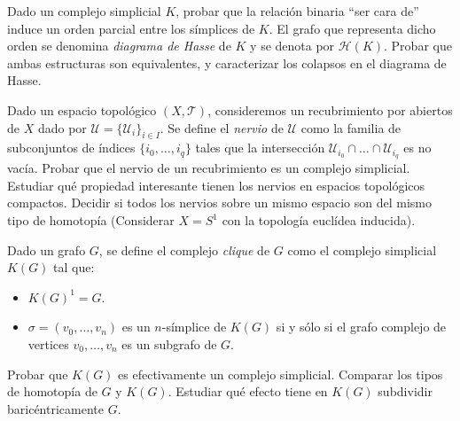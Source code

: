 \documentclass[twoside]{article}
\begin{document}
\newpage

\begin{ejercicio}{1.8}
Dado un complejo simplicial $K$, probar que la relación binaria ``ser cara de'' induce un orden parcial entre los símplices de $K$.
El grafo que representa dicho orden se denomina \emph{diagrama de Hasse} de $K$ y se denota por $\mathcal{H}(K)$.
Probar que ambas estructuras son equivalentes, y caracterizar los colapsos en el diagrama de Hasse.
\end{ejercicio}
\begin{solucion}
\end{solucion}

\newpage

\begin{ejercicio}{1.9}
Dado un  espacio topológico $(X,\mathcal{T})$, consideremos un recubrimiento por abiertos de $X$ dado por $\mathcal{U} = \{\mathcal{U}_i\}_{i \in I}$.
Se define el \emph{nervio} de $\mathcal{U}$ como la familia de subconjuntos de índices $\{i_0,\dots,i_q\}$ tales que la intersección $\mathcal{U}_{i_0} \cap \dots \cap \mathcal{U}_{i_q}$ es no vacía.
Probar que el nervio de un recubrimiento es un complejo simplicial.
Estudiar qué propiedad interesante tienen los nervios en espacios topológicos compactos.
Decidir si todos los nervios sobre un mismo espacio son del mismo tipo de homotopía
(Considerar $X = S^1$ con la topología euclídea inducida).
\end{ejercicio}
\begin{solucion}
\end{solucion}

\newpage

\begin{ejercicio}{1.10}
Dado un grafo $G$, se define el complejo \emph{clique} de $G$ como el complejo simplicial $K(G)$ tal que:
\begin{itemize}
\item $K(G)^1 = G$.
\item $σ = (v_0,\dots,v_n)$ es un $n$-símplice de $K(G)$ si y sólo si el grafo complejo de vertices $v_0,\dots,v_n$ es un subgrafo de $G$.
\end{itemize}
Probar que $K(G)$ es efectivamente un complejo simplicial.
Comparar los tipos de homotopía de $G$ y $K(G)$.
Estudiar qué efecto tiene en $K(G)$ subdividir baricéntricamente $G$.
\end{ejercicio}
\begin{solucion}
\end{solucion}

\newpage
\end{document}
